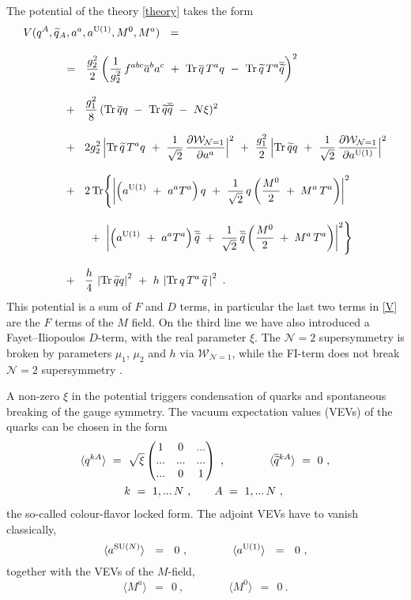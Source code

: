 \documentclass[12pt]{article}
\def\beq{\begin{equation}}
\def\eeq{\end{equation}}
\def\Tr{{\rm Tr}}
\newcommand{\ntwo}{${\mathcal N}=2$ }
\newcommand{\p}{\partial}
\newcommand{\wt}{\widetilde}
\newcommand{\ov}{\overline}
\newcommand{\mc}[1]{\mathcal{#1}}
\newcommand{\aU}{a^{\rm U(1)}}
\newcommand{\aN}{a^\text{SU($N$)}}
\begin{document}
	The potential of the theory \eqref{theory} takes the form
\begin{align}
%
\notag
	& V(q^A, \wt{q}{}_A, a^a, \aU, M^0, M^a) ~~=~~ 
	\\[3mm]
%
\notag
	&\qquad\quad ~~=~~
			\frac{g_2^2}{2} \left( \frac{1}{g_2^2}\,f^{abc}\ov{a}{}^b a^c 
				~+~ \Tr\, \ov{q}\, T^a q 
				~-~ \Tr\, \wt{q}\, T^a \ov{\wt{q}} \right)^2 
	\\[3mm]
%
\label{V}
	&\qquad\quad ~~+~~
		\frac{g_1^2}{8}\, (\Tr\, \ov{q} q ~-~ \Tr\, \wt{q} \ov{\wt{q}} ~-~ N\xi )^2
	\\[3mm]
%
\notag
	&\qquad\quad ~~+~~
		2g_2^2\, \Bigl| \Tr\, \wt{q}\,T^a q ~+~ 
			\frac{1}{\sqrt{2}}\, \frac{\p\mc{W}_{\mc{N}=1}}{\p a^a} \Bigr|^2
	~+~
	\frac{g_1^2}{2}\, \Bigl| \Tr\, \wt{q} q ~+~ 
			\frac{1}{\sqrt{2}}\, \frac{\p\mc{W}_{\mc{N}=1}}{\p\aU} \Bigr|^2
	\\[3mm]
%
\notag
	&\qquad\quad ~~+~~
	2\, \Tr \Biggl\{  
		\left| \left( \aU ~+~ a^a T^a \right) q ~+~
			\frac{1}{\sqrt{2}}\, q\left( \frac{M^0}{2} \;+\; M^a\,T^a \right) \right|^2 
	\\[3mm]
%
\notag
	&\phantom{\qquad\quad ~~+~~ 2 } ~+~
		\left| \left( \aU ~+~ a^a T^a \right) \ov{\wt{q}} ~+~
			\frac{1}{\sqrt{2}}\, \ov{\wt{q}}\left( \frac{M^0}{2} \;+\; M^a\,T^a \right) \right|^2 
			\Biggr\}
	\\[3mm]
%
\notag
	&\qquad\quad ~~+~~
	\frac{h}{4}\, \left| \Tr\, \wt{q}q \right|^2  ~+~ h\,\left| \Tr\, q\,T^a\,\wt{q} \,\right|^2	
	~.
\end{align}
	This potential is a sum of $ F $ and $ D $ terms, in particular the last two terms in \eqref{V}
	are the $ F $ terms of the  $ M $ field.
	On the third line we have also introduced a Fayet--Iliopoulos $ D $-term, with the real
	parameter $ \xi $.
	The \ntwo supersymmetry is broken by parameters $ \mu_1 $, $ \mu_2 $ and $ h $ via $ \mc{W}_{\mc{N}=1} $, while
	the FI-term does not break \ntwo supersymmetry \cite{HSZ,VY}.

	A non-zero $ \xi $ in the potential triggers condensation of quarks and spontaneous breaking 
	of the gauge symmetry. 
	The vacuum expectation values (VEVs) of the quarks can be chosen in the form
\begin{align}
%
\notag
&
	\langle q^{kA} \rangle ~=~ \sqrt{\xi} 
		\begin{pmatrix}
			 1  &   0  &  ... \\
			... &  ... &  ... \\
			... &   0  &  1 
		\end{pmatrix} ~,
	\qquad\qquad 
	\langle \ov{\wt{q}}{}^{kA} \rangle ~=~ 0~,
	\\
%
\label{qvev}
&
	\qquad\qquad  k~=~ 1,...\, N~, \qquad  A ~=~ 1,...\, N~,
\end{align}
	the so-called colour-flavor locked form.
	The adjoint VEVs have to vanish classically,
\beq
\label{avev}
	\langle \aN \rangle  ~~=~~ 0~, \qquad\qquad  \langle \aU \rangle ~~=~~ 0~,
\eeq
	together with the VEVs of the $ M $-field,
\beq
\label{Mvev}
	\langle M^a \rangle ~~=~~ 0~, \qquad\qquad  \langle M^0 \rangle ~~=~~ 0~.
\eeq
\end{document}
